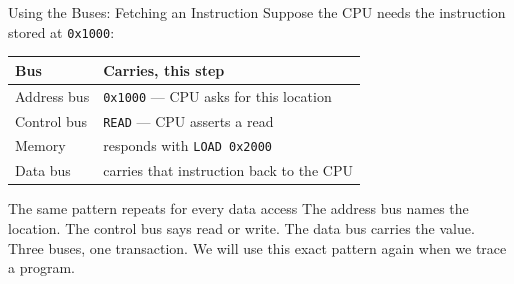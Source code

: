 \documentclass[9pt,aspectratio=169,xcolor=table]{beamer}
\begin{document}
\begin{frame}{Using the Buses: Fetching an Instruction}
    \leavevmode
    Suppose the CPU needs the instruction stored at \texttt{0x1000}:

    \vspace{2mm}
    \begin{center}
    {\small
    \begin{tabular}{@{}l l@{}}
        \toprule
        \textbf{Bus} & \textbf{Carries, this step} \\
        \midrule
        Address bus & \texttt{0x1000} --- CPU asks for this location \\
        Control bus & \texttt{READ} --- CPU asserts a read \\
        Memory      & responds with \texttt{LOAD 0x2000} \\
        Data bus    & carries that instruction back to the CPU \\
        \bottomrule
    \end{tabular}}
    \end{center}
\begin{center}  \end{center}
    \vspace{1mm}
    \begin{block}{The same pattern repeats for every data access}
        The address bus names the location. The control bus says read
        or write. The data bus carries the value. \alert{Three buses,
        one transaction.} We will use this exact pattern again when we
        trace a program.
    \end{block}
\end{frame}
\end{document}

